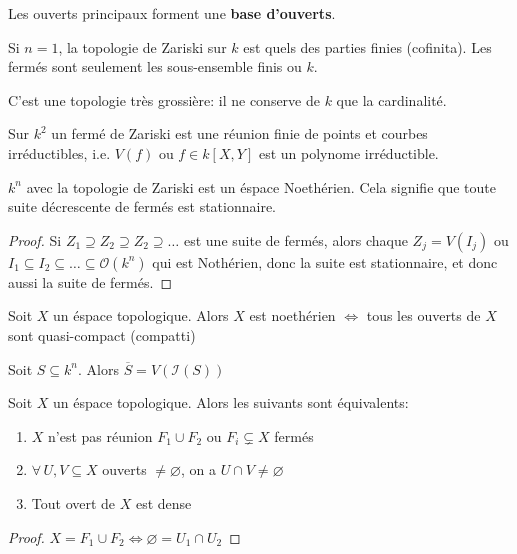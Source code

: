 \begin{proposition}{}
    Les ouverts principaux forment une \textbf{base d'ouverts}.
\end{proposition}

\begin{example}{}
    Si \(n = 1\), la topologie de Zariski sur \(k\) est quels des parties finies
    (cofinita). Les fermés sont seulement les sous-ensemble finis ou \(k\).

    C'est une topologie très grossière: il ne conserve de \(k\) que la
    cardinalité.
\end{example}

\begin{example}{}
    Sur \(k^2\) un fermé de Zariski est une réunion finie de points et courbes
    irréductibles, i.e. \(V{(f)}\) ou \(f \in k[X, Y]\) est un polynome
    irréductible.
\end{example}

\begin{lemma}{}
    \(k^{n}\) avec la topologie de Zariski est un éspace Noethérien. Cela
    signifie que toute suite décrescente de fermés est stationnaire.
\end{lemma}
\begin{proof}{}
    Si \(Z_{1} \supseteq Z_{2} \supseteq Z_{2} \supseteq \dots\) est une suite
    de fermés, alors chaque \(Z_{j} = V{(I_{j})}\) ou \(I_{1} \subseteq I_{2}
    \subseteq \dots   \subseteq \mathcal{O}{(k^{n})} \) qui est Nothérien, donc
    la suite est stationnaire, et donc aussi la suite de fermés.
\end{proof}

\begin{eser}{}
    Soit \(X\) un éspace topologique. Alors \(X\) est noethérien \(\iff\) tous
    les ouverts de \(X\) sont quasi-compact (compatti)
\end{eser}

\begin{eser}{}
    Soit \(S \subseteq k^{n} \). Alors \(\overline{S} = V{(\mathcal{I}{(S)})}\) 
\end{eser}

\begin{lemma}{}\label{lem:irreduct}
    Soit \(X\) un éspace topologique. Alors les suivants sont équivalents:
\begin{enumerate}[label = (\roman*)]
    \item \(X\) n'est pas réunion \(F_{1} \cup F_{2}\) ou \(F_{i} \subsetneq X\)
        fermés
    \item \(\forall \, U, V \subseteq X \) ouverts \(\neq \varnothing\), on a \(U
        \cap V \neq \varnothing\) 
    \item Tout overt de \(X\) est dense
\end{enumerate}
\end{lemma}
\begin{proof}{}
    \(X = F_{1} \cup F_{2} \iff \varnothing = U_{1} \cap U_{2}\) 
\end{proof}

